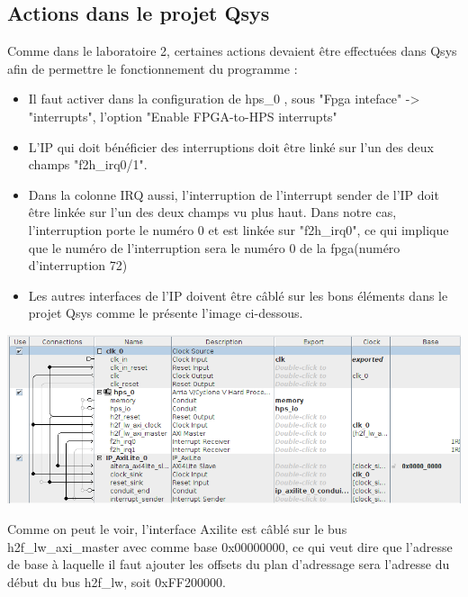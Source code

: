 \subsection{Actions dans le projet Qsys}
Comme dans le laboratoire 2, certaines actions devaient être effectuées dans Qsys afin de permettre le fonctionnement du programme : \\

\begin{itemize}
	\item Il faut activer dans la configuration de hps\_0 , sous "Fpga inteface" -> "interrupts", l'option "Enable FPGA-to-HPS interrupts"
	\item L'IP qui doit bénéficier des interruptions doit être linké sur l'un des deux champs "f2h\_irq0/1".
	\item Dans la colonne IRQ aussi, l'interruption de l'interrupt sender de l'IP doit être linkée sur l'un des deux champs vu plus haut. Dans notre cas, l'interruption porte le numéro 0 et est linkée sur "f2h\_irq0", ce qui implique que le numéro de l'interruption sera le numéro 0 de la fpga(numéro d'interruption 72)
	\item Les autres interfaces de l'IP doivent être câblé sur les bons éléments dans le projet Qsys comme le présente l'image ci-dessous. \\
\end{itemize}
\includegraphics[scale=0.5]{./images/cablage_qsys.png}

Comme on peut le voir, l'interface Axilite est câblé sur le bus h2f\_lw\_axi\_master avec comme base 0x00000000, ce qui veut dire que l'adresse de base à laquelle il faut ajouter les offsets du plan d'adressage sera l'adresse du début du bus h2f\_lw, soit 0xFF200000. 
